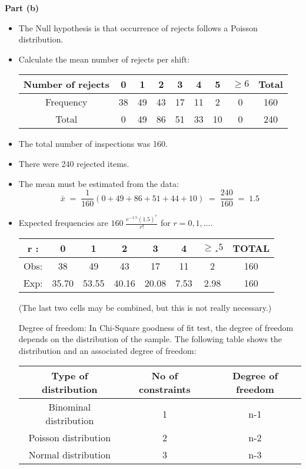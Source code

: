 \documentclass[a4paper,12pt]{article}
\begin{document}
		\medskip
	\noindent \textbf{Part (b)}
	\begin{itemize}
 \item The Null hypothesis is that occurrence of rejects follows a Poisson distribution.
 \item Calculate the mean number of rejects per shift: 
		\begin{center}
			\begin{tabular}{|c|c|c|c|c|c|c|c||c|} \hline
				Number of rejects & 0 & 1 & 2 & 3 & 4 & 5 & $\geq 6$ & Total\\ \hline
				Frequency & 38 & 49 & 43 & 17 & 11 & 2 & 0 & 160 \\ \hline  
				Total & 0 & 49 & 86 & 51 & 33 & 10 & 0 & 240 \\ \hline
			\end{tabular}
		\end{center}
		\large 
		\item The total number of inspections was 160.
		\item There were 240 rejected items.
		\item The mean must be estimated from the data:
		\[ \bar{x} \; = \;
		\frac{1}{160}
		(0 + 49 + 86 + 51 + 44 + 10) \;=\;
		\frac{240}{160}
		\;=\; 1.5 \]
		\newpage 
		\item Expected frequencies are ${ \displaystyle 160\; \frac{e^{-1.5}(1.5)^r}{r!} }$ for $r = 0, 1, \ldots$.
		
		\large
		\begin{center}
			\begin{tabular}{|c||c|c|c|c|c|c||c|}\hline
				r : &0 & 1 & 2 & 3 & 4 & $\geq¸ 5$ & TOTAL\\ \hline 
				Obs:& 38 & 49 & 43 & 17 & 11 & 2&  160\\ \hline
				Exp: &35.70& 53.55& 40.16 & 20.08 & 7.53&  2.98 & 160 \\ \hline
			\end{tabular}
		\end{center}
		(The last two cells may be combined, but this is not really necessary.)
		\\
		
		\begin{framed}
			Degree of freedom: In Chi-Square goodness of fit test, the degree of freedom depends on the distribution of the sample.  The following table shows the distribution and an associated degree of freedom:
			
			\begin{center}
				\begin{tabular}{|c|c|c|} \hline 
					Type of distribution 	& No of constraints &	Degree of freedom \\  \hline 
					Binominal distribution 	&1& 	n-1 \\  \hline   
					Poisson distribution 	&2& 	n-2\\  \hline  
					Normal distribution 	&3& 	n-3\\  \hline 
				\end{tabular}
			\end{center}
			

\end{framed}
\end{itemize}
\end{document}
